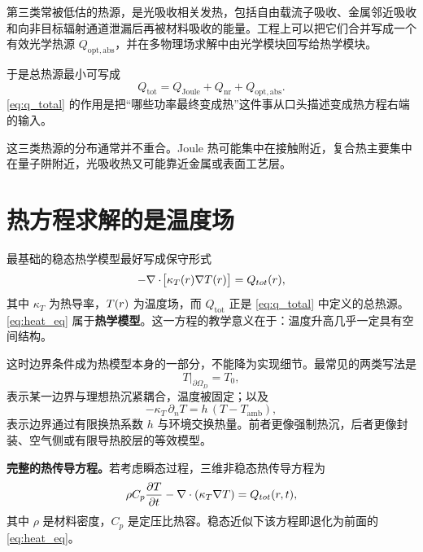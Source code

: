 第三类常被低估的热源，是光吸收相关发热，包括自由载流子吸收、金属邻近吸收和向非目标辐射通道泄漏后再被材料吸收的能量。工程上可以把它们合并写成一个有效光学热源 $Q_{\mathrm{opt,abs}}$，并在多物理场求解中由光学模块回写给热学模块。

于是总热源最小可写成
\begin{equation}
Q_{\mathrm{tot}}
=
Q_{\mathrm{Joule}}+Q_{\mathrm{nr}}+Q_{\mathrm{opt,abs}}.
\label{eq:q_total}
\end{equation}
\cref{eq:q_total} 的作用是把“哪些功率最终变成热”这件事从口头描述变成热方程右端的输入。

这三类热源的分布通常并不重合。Joule 热可能集中在接触附近，复合热主要集中在量子阱附近，光吸收热又可能靠近金属或表面工艺层。

\section{热方程求解的是温度场}
最基础的稳态热学模型最好写成保守形式
\begin{equation}
-\nabla\cdot\!\big[\kappa_T(r)\nabla T(r)\big]
=
Q_{tot}(r),
\label{eq:heat_eq}
\end{equation}
其中 $\kappa_T$ 为热导率，$T(r)$ 为温度场，而 $Q_{\mathrm{tot}}$ 正是 \cref{eq:q_total} 中定义的总热源。\cref{eq:heat_eq} 属于\textbf{热学模型}。这一方程的教学意义在于：温度升高几乎一定具有空间结构。

这时边界条件成为热模型本身的一部分，不能降为实现细节。最常见的两类写法是
\begin{equation}
T|_{\partial\Omega_D}=T_0,
\label{eq:thermal_bc_dirichlet}
\end{equation}
表示某一边界与理想热沉紧耦合，温度被固定；以及
\begin{equation}
-\kappa_T\,\partial_n T
=
h\,(T-T_{\mathrm{amb}}),
\label{eq:thermal_bc_robin}
\end{equation}
表示边界通过有限换热系数 $h$ 与环境交换热量。前者更像强制热沉，后者更像封装、空气侧或有限导热胶层的等效模型。

\textbf{完整的热传导方程。}若考虑瞬态过程，三维非稳态热传导方程为
\begin{equation}
\rho C_p \frac{\partial T}{\partial t}
-
\nabla\cdot\left(\kappa_T\nabla T\right)
=
Q_{tot}(r,t),
\label{eq:heat_transient}
\end{equation}
其中 $\rho$ 是材料密度，$C_p$ 是定压比热容。稳态近似下该方程即退化为前面的 \cref{eq:heat_eq}。

